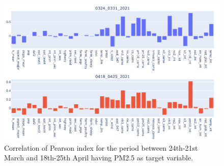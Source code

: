 \begin{figure}[H]
    \centering
    \includegraphics[scale=0.45]{src/images/tests/correlations_pm25.png}
    \caption{Correlation of Pearson index for the period between 24th-21st March and 18th-25th April having PM2.5 as target variable.}
    \label{fig:corr-pearson}
\end{figure}

